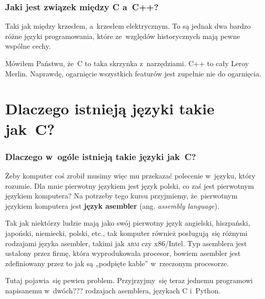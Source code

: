 \documentclass[10pt,t]{beamer}
\begin{document}
\begin{frame}
  \frametitle{Jaki jest związek między C a~C++?}


  Taki jak między krzesłem, a~krzesłem elektrycznym. To są jednak dwa
  bardzo różne języki programowania, które ze~względów historycznych mają
  pewne wspólne cechy.

  Mówiłem Państwu, że~C to taka skrzynka z~narzędziami. C++ to cały Leroy
  Merlin. Naprawdę, ogarnięcie wszystkich featurów jest zupełnie nie do
  ogarnięcia.

\end{frame}










\section{Dlaczego istnieją języki takie jak~C?}



\begin{frame}
  \frametitle{Dlaczego w~ogóle istnieją takie języki jak~C?}

  \pause


  Żeby komputer coś zrobił musimy więc mu przekazać polecenie w~języku,
  który rozumie. Dla mnie pierwotny językiem jest język polski, co zaś
  jest pierwotnym językiem komputera? Na potrzeby tego kursu przyjmiemy,
  że~pierwotnym językiem komputera jest \textbf{język asembler}
  (ang. \textit{assembly language}).

  Tak jak niektórzy ludzie mają jako swój pierwotny język angielski,
  hiszpański, japoński, niemiecki, polski, etc., tak komputer również
  posługują~się różnymi rodzajami języka asembler, takimi jak \textsc{arm}
  czy x86/Intel. Typ asemblera jest ustalony przez firmę, która
  wyprodukowała procesor, bowiem asembler jest zdefiniowany przez to jak są
  „podpięte kable” w~rzeczonym procesorze.

  Tutaj pojawia~się pewien problem. Przyjrzyjmy~się teraz jednemu programowi
  napisanemu w~dwóch??? rodzajach asemblera, językach C i~Python.

\end{frame}
\end{document}
